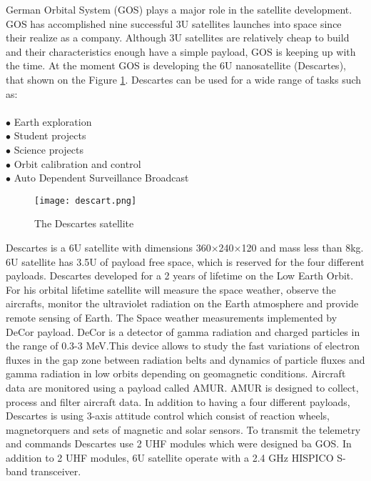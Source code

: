 German Orbital System (GOS) plays a major role in the satellite development. GOS has accomplished nine successful 3U satellites launches into space since their realize as a company. Although 3U satellites are relatively cheap to build and their characteristics enough have a simple payload, GOS is keeping up with the time. At the moment GOS is developing the 6U nanosatellite (Descartes), that shown on the Figure \ref{fig: EPS222}. Descartes can be used for a wide range of tasks such as:\\ \\
$\bullet$ Earth exploration\\ 
$\bullet$ Student projects\\ 
$\bullet$ Science projects\\ 
$\bullet$ Orbit calibration and control\\ 
$\bullet$ Auto Dependent Surveillance Broadcast\\ 



\begin{figure}[h]
	\centering
	\texttt{[image: descart.png]}
	\caption{The Descartes satellite}
	\label{fig: EPS222}
\end{figure}


  Descartes is a 6U satellite with dimensions 360$\times$240$\times$120 and mass less than 8kg. 6U satellite has 3.5U of payload free space, which is reserved for the four different payloads. Descartes developed for a 2 years of lifetime on the Low Earth Orbit. For his orbital lifetime satellite will measure the space weather, observe the aircrafts, monitor the ultraviolet radiation on the Earth atmosphere  and provide remote sensing of Earth. The Space weather measurements implemented by DeCor payload. DeCor is a detector of gamma radiation and charged particles in the range of 0.3-3 MeV.This device allows to study the fast variations of electron fluxes in the gap zone between radiation belts and dynamics of particle fluxes and gamma radiation in low orbits depending on geomagnetic conditions. Aircraft data are monitored using a payload called AMUR. AMUR is designed to collect, process and filter aircraft data. 
  In addition to having a four different payloads, Descartes is using 3-axis attitude control which consist of reaction wheels, magnetorquers and sets of magnetic and solar sensors. To transmit the telemetry and commands Descartes use 2 UHF modules which were designed ba GOS. In addition to 2 UHF modules, 6U satellite operate with a 2.4 GHz HISPICO S-band transceiver.\\ \\
 
